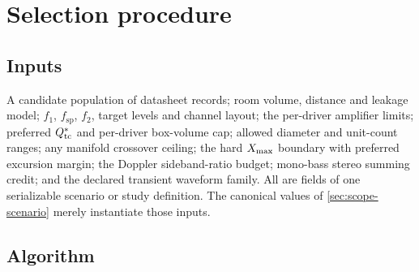 \section{Selection procedure}
\label{sec:procedure}

\subsection{Inputs}
\label{sec:procedure-inputs}

A candidate population of datasheet records; room volume, distance and
leakage model; $f_1$, $f_{\mathrm{sp}}$, $f_2$, target levels and channel
layout; the per-driver amplifier limits; preferred $Q_{\mathrm{tc}}^\ast$ and
per-driver box-volume cap; allowed diameter and unit-count ranges; any
manifold crossover ceiling; the hard $X_{\mathrm{max}}$ boundary with preferred
excursion margin; the Doppler sideband-ratio budget; mono-bass stereo
summing credit; and the declared transient waveform family. All are fields
of one serializable scenario or study definition. The canonical values of
\cref{sec:scope-scenario} merely instantiate those inputs.

\subsection{Algorithm}
\label{sec:procedure-algorithm}

